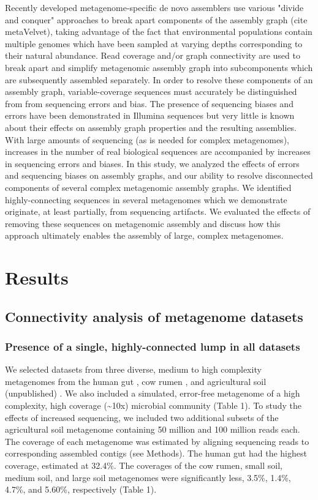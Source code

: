 \documentclass[11pt]{article} %
\begin{document}
Recently developed metagenome-specific de novo assemblers use various "divide and conquer" approaches to break apart components of the assembly graph \cite{Peng:2011p898} (cite metaVelvet), taking advantage of the fact that environmental populations contain multiple genomes which have been sampled at varying depths corresponding to their natural abundance.  Read coverage and/or graph connectivity are used to break apart and simplify metagenomic assembly graph into subcomponents which are subsequently assembled separately.  In order to resolve these components of an assembly graph, variable-coverage sequences must accurately be distinguished from from sequencing errors and bias.  The presence of sequencing biases and errors have been demonstrated in Illumina sequences \cite{Harismendy:2009p228,Hoffmann:2009p1027,Nakamura:2011p741} but very little is known about their effects on assembly graph properties and the resulting assemblies.  With large amounts of sequencing (as is needed for complex metagenomes), increases in the number of real biological sequences are accompanied by increases in sequencing errors and biases.  In this study, we analyzed the effects of errors and sequencing biases on assembly graphs, and our ability to resolve disconnected components of several complex metagenomic assembly graphs.  We identified highly-connecting sequences in several metagenomes which we demonstrate originate, at least partially, from sequencing artifacts.  We evaluated the effects of removing these sequences on metagenomic assembly and discuss how this approach ultimately enables the assembly of large, complex metagenomes.  

\section{Results}

\subsection{Connectivity analysis of metagenome datasets}

\subsubsection{Presence of a single, highly-connected lump in all datasets}
We selected datasets from three diverse, medium to high complexity metagenomes from the human gut \cite{Qin:2010p189}, cow rumen \cite{Hess:2011p686}, and agricultural soil (unpublished) . We also included a simulated, error-free metagenome of a high complexity, high coverage (\textasciitilde{}10x) microbial community \cite{Pignatelli:2011p742} (Table 1). To study the effects of increased sequencing, we included two additional subsets of the agricultural soil metagenome containing 50 million and 100 million reads each.   The coverage of each metagenome was estimated by aligning sequencing reads to corresponding assembled contigs (see Methods).   The human gut had the highest coverage, estimated at 32.4\%.  The coverages of the cow rumen, small soil, medium soil, and large soil metagenomes were significantly less, 3.5\%, 1.4\%, 4.7\%, and 5.60\%, respectively (Table 1).  
\end{document}
